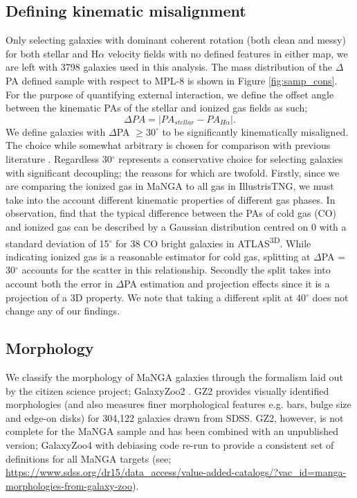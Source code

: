 \documentclass[fleqn,usenatbib]{mnras}
\begin{document}
\subsection{Defining kinematic misalignment} \label{sec:def_kin_mis}
Only selecting galaxies with dominant coherent rotation (both clean and messy) for both stellar and H$\alpha$ velocity fields with no defined features in either map, we are left with 3798 galaxies used in this analysis. The mass distribution of the $\Delta$PA defined sample with respect to MPL-8 is shown in Figure \ref{fig:samp_cons}. For the purpose of quantifying external interaction, we define the offset angle between the kinematic PAs of the stellar and ionized gas fields as such; 
\begin{equation} \label{eq:delPA}
\Delta PA = |PA_{stellar} - PA_{H\alpha}|. 
\end{equation}
We define galaxies with $\Delta$PA $\geq 30^{\circ}$ to be significantly kinematically misaligned. The choice while somewhat arbitrary is chosen for comparison with previous literature \citep[e.g.][]{davis2011, bryant2019}. Regardless 30$^{\circ}$ represents a conservative choice for selecting galaxies with significant decoupling; the reasons for which are twofold. Firstly, since we are comparing the ionized gas in MaNGA to all gas in IllustrisTNG, we must take into the account different kinematic properties of different gas phases. In observation, \citet{davis2011molecular} find that the typical difference between the PAs of cold gas (CO) and ionized gas can be described by a Gaussian distribution centred on 0 with a standard deviation of 15$^{\circ}$ for 38 CO bright galaxies in ATLAS\textsuperscript{3D}. While indicating ionized gas is a reasonable estimator for cold gas, splitting at $\Delta$PA = 30$^{\circ}$ accounts for the scatter in this relationship. Secondly the split takes into account both the error in $\Delta$PA estimation \citep[a few $^{\circ}$; see Appendix A3 of][]{duckworth2019} and projection effects since it is a projection of a 3D property. We note that taking a different split at 40$^{\circ}$ does not change any of our findings.

\subsection{Morphology} \label{sec:morph_def}
We classify the morphology of MaNGA galaxies through the formalism laid out by the citizen science project; GalaxyZoo2 \citep[GZ2;][]{willett2013}. GZ2 provides visually identified morphologies (and also measures finer morphological features e.g. bars, bulge size and edge-on disks) for 304,122 galaxies drawn from SDSS. GZ2, however, is not complete for the MaNGA sample and has been combined with an unpublished version; GalaxyZoo4 with debiasing code re-run to provide a consistent set of definitions for all MaNGA targets (see; \url{https://www.sdss.org/dr15/data_access/value-added-catalogs/?vac_id=manga-morphologies-from-galaxy-zoo}). 
\end{document}
